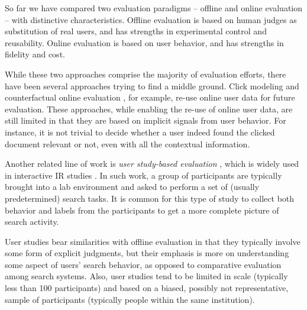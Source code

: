 So far we have compared two evaluation paradigms -- offline and online evaluation -- with distinctive characteristics. Offline evaluation is based on human judges as substitution of real users, and has strengths in experimental control and reusability. Online evaluation is based on user behavior, and has strengths in fidelity and cost.


While these two approaches comprise the majority of evaluation efforts, there have been several approaches trying to find a middle ground. Click modeling \citep{chuklin2015click} and counterfactual online evaluation \citep{Li:2015, li2010contextual}, for example, re-use online user data for future evaluation. These approaches, while enabling the re-use of online user data, are still limited in that they are based on implicit signals from user behavior. For instance, it is not trivial to decide whether a user indeed found the clicked document relevant or not, even with all the contextual information.


Another related line of work is \textit{user study-based evaluation} \citep{Bron:2013, Liu:2014, Shah:2011}, which is widely used in interactive IR studies \citep{kelly2009methods}. In such work, a group of participants are typically brought into a lab environment and asked to perform a set of (usually predetermined) search tasks. It is common for this type of study to collect both behavior and labels from the participants to get a more complete picture of search activity. 

User studies bear similarities with offline evaluation in that they typically involve some form of explicit judgments, but their emphasis is more on understanding some aspect of users' search behavior, as opposed to comparative evaluation among search systems. Also, user studies tend to be limited in scale (typically less than 100 participants) and based on a biased, possibly not representative, sample of participants (typically people within the same institution).


